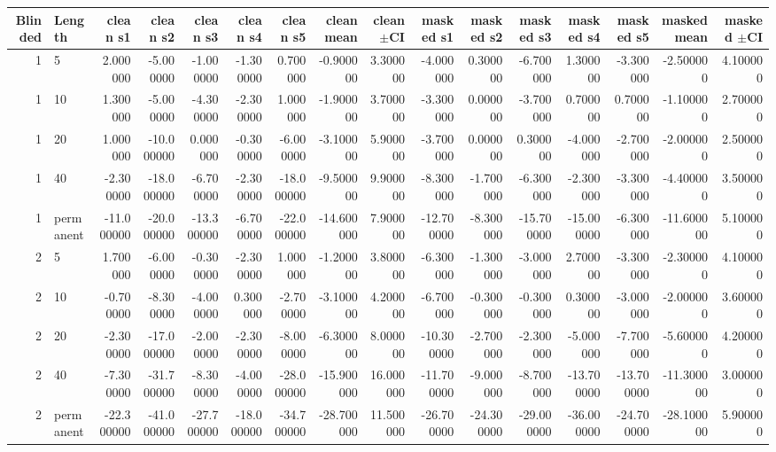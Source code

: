 \begin{tabular}{rlrrrrrrrrrrrrrr}
\toprule
Blinded & Length & clean s1 & clean s2 & clean s3 & clean s4 & clean s5 & clean mean & clean $\pm$CI & masked s1 & masked s2 & masked s3 & masked s4 & masked s5 & masked mean & masked $\pm$CI \\
\midrule
1 & 5 & 2.000000 & -5.000000 & -1.000000 & -1.300000 & 0.700000 & -0.900000 & 3.300000 & -4.000000 & 0.300000 & -6.700000 & 1.300000 & -3.300000 & -2.500000 & 4.100000 \\
1 & 10 & 1.300000 & -5.000000 & -4.300000 & -2.300000 & 1.000000 & -1.900000 & 3.700000 & -3.300000 & 0.000000 & -3.700000 & 0.700000 & 0.700000 & -1.100000 & 2.700000 \\
1 & 20 & 1.000000 & -10.000000 & 0.000000 & -0.300000 & -6.000000 & -3.100000 & 5.900000 & -3.700000 & 0.000000 & 0.300000 & -4.000000 & -2.700000 & -2.000000 & 2.500000 \\
1 & 40 & -2.300000 & -18.000000 & -6.700000 & -2.300000 & -18.000000 & -9.500000 & 9.900000 & -8.300000 & -1.700000 & -6.300000 & -2.300000 & -3.300000 & -4.400000 & 3.500000 \\
1 & permanent & -11.000000 & -20.000000 & -13.300000 & -6.700000 & -22.000000 & -14.600000 & 7.900000 & -12.700000 & -8.300000 & -15.700000 & -15.000000 & -6.300000 & -11.600000 & 5.100000 \\
2 & 5 & 1.700000 & -6.000000 & -0.300000 & -2.300000 & 1.000000 & -1.200000 & 3.800000 & -6.300000 & -1.300000 & -3.000000 & 2.700000 & -3.300000 & -2.300000 & 4.100000 \\
2 & 10 & -0.700000 & -8.300000 & -4.000000 & 0.300000 & -2.700000 & -3.100000 & 4.200000 & -6.700000 & -0.300000 & -0.300000 & 0.300000 & -3.000000 & -2.000000 & 3.600000 \\
2 & 20 & -2.300000 & -17.000000 & -2.000000 & -2.300000 & -8.000000 & -6.300000 & 8.000000 & -10.300000 & -2.700000 & -2.300000 & -5.000000 & -7.700000 & -5.600000 & 4.200000 \\
2 & 40 & -7.300000 & -31.700000 & -8.300000 & -4.000000 & -28.000000 & -15.900000 & 16.000000 & -11.700000 & -9.000000 & -8.700000 & -13.700000 & -13.700000 & -11.300000 & 3.000000 \\
2 & permanent & -22.300000 & -41.000000 & -27.700000 & -18.000000 & -34.700000 & -28.700000 & 11.500000 & -26.700000 & -24.300000 & -29.000000 & -36.000000 & -24.700000 & -28.100000 & 5.900000 \\
\bottomrule
\end{tabular}
